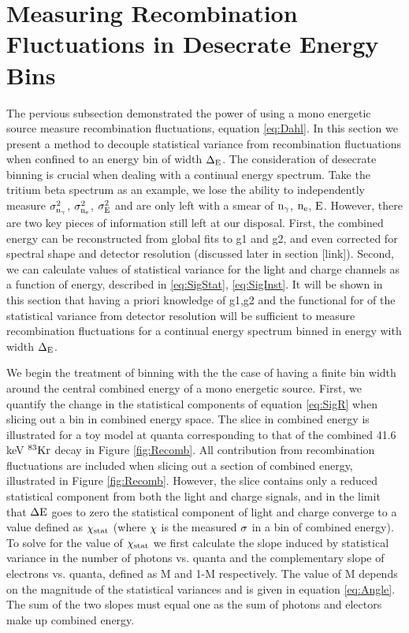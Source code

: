 \section{Measuring Recombination Fluctuations in Desecrate Energy Bins}
\label{sec:flucs_mono_bins}

The pervious subsection demonstrated the power of using a mono energetic source measure recombination fluctuations, equation  \ref{eq:Dahl}. In this section we present a method to decouple statistical variance from recombination fluctuations when confined to an energy bin of width $\rm \Delta_E$. The consideration of desecrate binning is crucial when dealing with a continual energy spectrum. Take the tritium beta spectrum as an example, we lose the ability to independently measure $\rm \sigma_{n_\gamma}^2$, $\rm \sigma_{n_e}^2$, $\rm \sigma_{E}^2 $ and are only left with a smear of $\rm n_\gamma$, $\rm n_e$, $\rm E $. However, there are two key pieces of information still left at our disposal. First, the combined energy can be reconstructed from global fits to g1 and g2, and even corrected for spectral shape and detector resolution (discussed later in section [link]). Second, we can calculate values of statistical variance for the light and charge channels as a function of energy, described in \ref{eq:SigStat},  \ref{eq:SigInst}. It will be shown in this section that having a priori knowledge of g1,g2 and the functional for of the statistical variance from detector resolution will be sufficient to measure recombination fluctuations for a continual energy spectrum binned in energy with width $\rm \Delta_E$.


We begin the treatment of binning with the the case of having a finite bin width around the central combined energy of a mono energetic source. First, we quantify the change in the statistical components of equation \ref{eq:SigR} when slicing out a bin in combined energy space. The slice in combined energy is illustrated for a toy model at quanta corresponding to that of the combined 41.6 keV $\rm^{83}Kr$ decay in Figure \ref{fig:Recomb}. All contribution from recombination fluctuations are included when slicing out a section of combined energy, illustrated in Figure \ref{fig:Recomb}. However, the slice contains only a reduced statistical component from both the light and charge signals, and in the limit that $\rm \Delta E$ goes to zero the statistical component of light and charge converge to a value defined as $\rm \chi_{stat}$ (where $\rm \chi$ is the measured $\rm \sigma$ in a bin of combined energy). To solve for the value of  $\rm \chi_{stat}$ we first calculate the slope induced by statistical variance in the number of photons vs. quanta and the complementary slope of electrons vs. quanta, defined as M and 1-M respectively.  The value of M depends on the magnitude of the statistical variances and is given in equation \ref{eq:Angle}. The sum of the two slopes must equal one as the sum of photons and electors make up combined energy.


